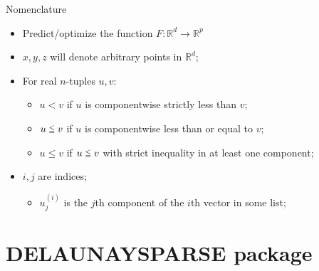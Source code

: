 \documentclass[xcolor=dvipsnames]{beamer}
\def\lee{\mathrel{\vcenter{\hbox{$\scriptstyle\mathord<$}\nointerlineskip
\vskip 1pt\hbox{$\scriptstyle\mathord=$}}}}
\begin{document}
\begin{frame}{Nomenclature}
\begin{itemize}
\item Predict/optimize the function $F : \mathbb{R}^d\rightarrow\mathbb{R}^p$
\item $x,y,z$ will denote arbitrary points in $\mathbb{R}^d$;
\item For real $n$-tuples $u,v$:
\begin{itemize}
\item $u < v$ if $u$ is componentwise strictly less than $v$;
\item $u \lee v$ if $u$ is componentwise less than or equal to $v$;
\item $u \leq v$ if $u \lee v$ with strict inequality in at least one component;
\end{itemize}
\item $i,j$ are indices;
\begin{itemize}
\item $u^{(i)}_j$ is the $j$th component of the $i$th vector in some list;
\end{itemize}
\end{itemize}
\end{frame}

\section{DELAUNAYSPARSE package}
\end{document}
